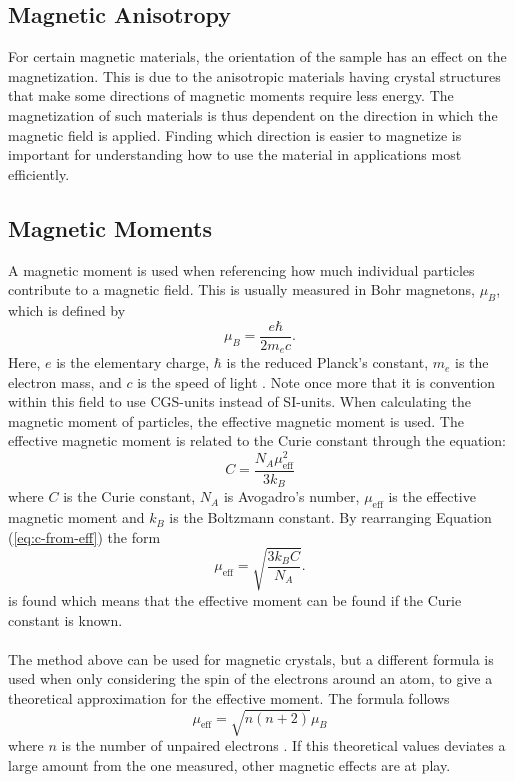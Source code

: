     \subsection{Magnetic Anisotropy}
    For certain magnetic materials, the orientation of the sample has an effect on the magnetization. This is due to the anisotropic materials having 
    crystal structures that make some directions of magnetic moments require less energy. The magnetization of such materials is thus dependent on the 
    direction in which the magnetic field is applied. Finding which direction is easier to magnetize is important for understanding how to use the 
    material in applications most efficiently. \cite{mugiraneza2022tutorial}
    \subsection{Magnetic Moments}
    A magnetic moment is used when referencing how much individual particles contribute to a magnetic field. This is usually measured in Bohr
     magnetons, $\mu_B$, which is defined by \begin{equation}\label{eq:b-magnetons-SI}
        \mu_B = \frac{e\hbar}{2m_e c}. 
    \end{equation}Here, $e$ is the elementary charge, $\hbar$ is the reduced Planck's constant, $m_e$ is the electron mass, and $c$ is the speed of light \cite{danescu2011bohrmagneton}.
    Note once more that it 
    is convention within this field to use CGS-units instead of SI-units. When calculating the magnetic moment of particles, the effective magnetic 
    moment is used. The effective magnetic moment is related to the Curie constant through the equation: \begin{equation}\label{eq:c-from-eff}
        C=\frac{N_A\mu_{\textrm{eff}}^2}{3k_B}
    \end{equation} where $C$ is the Curie constant, $N_A$ is Avogadro's number, $\mu_{\textrm{eff}}$ is the effective magnetic moment and $k_B$ is the 
    Boltzmann constant. By rearranging Equation (\ref{eq:c-from-eff}) the form \begin{equation}\label{eq:u-eff}
        \mu_{\textrm{eff}} = \sqrt{\frac{3k_BC}{N_A}}.
    \end{equation} is found which means that the effective moment can be found if the Curie constant is known. \\ \\
    The method above can be used for magnetic crystals, but a different formula is used when only considering the spin of the electrons around an atom, 
    to give a 
    theoretical approximation for the effective moment. The formula follows \begin{equation}\label{eq:free-ions-moment}
        \mu_{\textrm{eff}}= \sqrt{n(n+2)}\mu_{B}
    \end{equation}
    where $n$ is the number of unpaired electrons \cite{dalal2017magnetic}. If this theoretical values deviates a large amount from the one measured, other magnetic effects are 
    at play.
    

